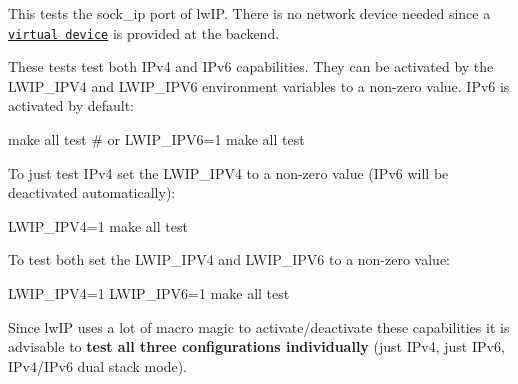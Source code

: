 This tests the {\ttfamily sock\+\_\+ip} port of lw\+IP. There is no network device needed since a \href{http://doc.riot-os.org/group__sys__netdev__test.html}{\tt virtual device} is provided at the backend.

These tests test both I\+Pv4 and I\+Pv6 capabilities. They can be activated by the {\ttfamily L\+W\+I\+P\+\_\+\+I\+P\+V4} and {\ttfamily L\+W\+I\+P\+\_\+\+I\+P\+V6} environment variables to a non-\/zero value. I\+Pv6 is activated by default\+:


\begin{DoxyCode}
make all test
# or
LWIP\_IPV6=1 make all test
\end{DoxyCode}


To just test I\+Pv4 set the {\ttfamily L\+W\+I\+P\+\_\+\+I\+P\+V4} to a non-\/zero value (I\+Pv6 will be deactivated automatically)\+:


\begin{DoxyCode}
LWIP\_IPV4=1 make all test
\end{DoxyCode}


To test both set the {\ttfamily L\+W\+I\+P\+\_\+\+I\+P\+V4} and {\ttfamily L\+W\+I\+P\+\_\+\+I\+P\+V6} to a non-\/zero value\+:


\begin{DoxyCode}
LWIP\_IPV4=1 LWIP\_IPV6=1 make all test
\end{DoxyCode}


Since lw\+IP uses a lot of macro magic to activate/deactivate these capabilities it is advisable to {\bfseries test all three configurations individually} (just I\+Pv4, just I\+Pv6, I\+Pv4/\+I\+Pv6 dual stack mode). 